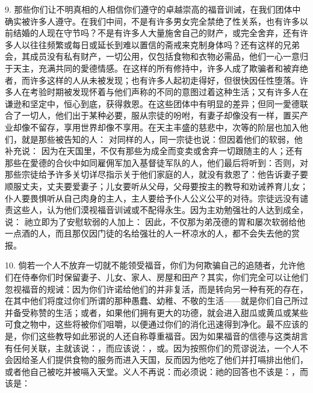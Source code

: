 9. 那些你们让不明真相的人相信你们遵守的卓越崇高的福音训诫，在我们团体中确实被许多人遵守。在我们中间，不是有许多男女完全禁绝了性关系，也有许多以前结婚的人现在守节吗？不是有许多人大量施舍自己的财产，或完全舍弃，还有许多人以往往频繁或每日或延长到难以置信的斋戒来克制身体吗？还有这样的兄弟会，其成员没有私有财产，一切公用，仅包括食物和衣物必需品，他们一心一意归于天主，充满共同的愛德情感。在这样的所有修持中，许多人成了欺骗者和被弃绝者，而许多这样的人从未被发现；也有许多人起初走得好，但很快因任性堕落。许多人在考验时期被发现怀着与他们声称的不同的意图过着这种生活；又有许多人在谦逊和坚定中，恒心到底，获得救恩。在这些团体中有明显的差异；但同一愛德联合了一切人，他们出于某种必要，服从宗徒的吩咐，有妻子却像没有一样，置买产业却像不留存，享用世界却像不享用。在天主丰盛的慈悲中，次等的阶层也加入他们，就是那些被告知的人： 对同样的人，同一宗徒也说：但因着他们的软弱，他补充说： 因为在天国里，不仅有那些为成全而变卖或舍弃一切跟随主的人；还有那些在愛德的合伙中如同雇佣军加入基督徒军队的人，他们最后将听到：否则，对那些宗徒给予许多关切详尽指示关于他们家庭的人，就没有救恩了：他告诉妻子要顺服丈夫，丈夫要爱妻子；儿女要听从父母，父母要按主的教导和劝诫养育儿女；仆人要畏惧听从自己肉身的主人，主人要给予仆人公义公平的对待。宗徒远没有谴责这些人，认为他们漠视福音训诫或不配得永生。因为主劝勉强壮的人达到成全，说： 祂立即为了安慰软弱的人加上： 因此，不仅那为弟茂德的胃和屡次软弱给他一点酒的人，而且那仅因门徒的名给强壮的人一杯凉水的人，都不会失去他的赏报。\par

10. 倘若一个人不放弃一切就不能领受福音，你们为何欺骗自己的追随者，允许他们在侍奉你们时保留妻子、儿女、家人、房屋和田产？其实，你们完全可以让他们忽视福音的规诫：因为你们许诺给他们的并非复活，而是转向另一种有死的存在，在其中他们将度过你们所谓的那种愚蠢、幼稚、不敬的生活——就是你们自己所过并备受称赞的生活；或者，如果他们拥有更大的功德，就会进入甜瓜或黄瓜或某些可食之物中，这些将被你们咀嚼，以便通过你们的消化迅速得到净化。最不应该的是，你们这些教导如此邪说的人还自称尊重福音。因为如果福音的信德与这类胡言有任何关联，主就该说：，而应该说：，或。因为按照你们的荒谬说法，一个人不会因给圣人们提供食物的服务而进入天国，反而因为他吃了他们并打嗝排出他们，或者他自己被吃并被嗝入天堂。义人不再说：而必须说：祂的回答也不该是：，而该是：\par

